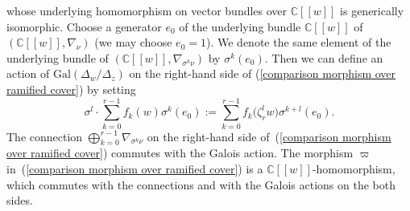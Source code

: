 \documentclass[pdftex]{sigma}
\numberwithin{equation}{section}
\begin{document}
whose underlying homomorphism on vector bundles over $\mathbb{C}[[w]]$
is generically isomorphic.
Choose a generator $e_0$ of the underlying bundle $\mathbb{C}[[w]]$
of $(\mathbb{C}[[w]],\nabla_{\nu})$ (we may choose $e_0=1$).
We denote the same element of the underlying bundle of
$(\mathbb{C}[[w]],\nabla_{\sigma^k\nu})$ by $\sigma^k(e_0)$.
Then we can define an action of
$\mathrm{Gal}(\Delta_w/\Delta_z)$ on the right-hand side of
(\ref{comparison morphism over ramified cover})
by setting
\[
 \sigma^l\cdot\sum_{k=0}^{r-1}f_k(w)\sigma^k(e_0)
 :=\sum_{k=0}^{r-1}f_k\big(\zeta_r^lw\big) \sigma^{k+l}(e_0).
\]
The connection
$\bigoplus_{k=0}^{r-1}\nabla_{\sigma^k\nu}$
on the right-hand side of~(\ref{comparison morphism over ramified cover})
commutes with the Galois action.
The morphism $\varpi$ in~(\ref{comparison morphism over ramified cover})
is a $\mathbb{C}[[w]]$-homomorphism, which
commutes with the connections
and with the Galois actions on the both sides.
\end{document}
